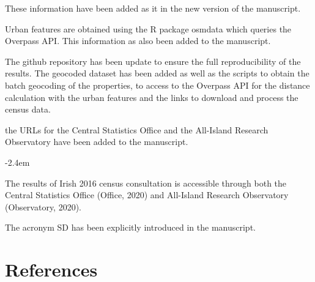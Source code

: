 \documentclass[]{article}
\renewenvironment{quote}{\begin{fquote}\advance\leftmargini -2.4em\begin{oldquote}}{\end{oldquote}\end{fquote}}
\newenvironment{fquote}
  {\def\FrameCommand{
	\fboxsep=0.6em %
	\fcolorbox{black}{white}}%
    \MakeFramed {\advance\hsize-2\width \FrameRestore}
    \begin{minipage}{\linewidth}
  }
  {\end{minipage}\endMakeFramed}
\begin{document}
These information have been added as it in the new version of the manuscript.

Urban features are obtained using the R package osmdata which queries the Overpass API. This information as also been added to the manuscript.


The github repository has been update to ensure the full reproducibility of the results. The geocoded dataset has been added as well as the scripts to obtain the batch geocoding of the properties, to access to the Overpass API for the distance calculation with the urban features and the links to download and process the census data.


the URLs for the Central Statistics Office and the All-Island Research Observatory have been added to the manuscript.

\begin{quote}
The results of Irish 2016 census consultation is accessible through both the Central Statistics Office (Office, 2020) and All-Island Research Observatory (Observatory, 2020).
\end{quote}


The acronym SD has been explicitly introduced in the manuscript.

\hypertarget{references}{%
\section*{References}\label{references}}
\end{document}
